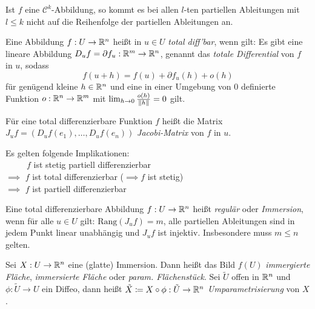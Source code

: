\documentclass{cheat-sheet}
\newcommand{\Cont}{\mathcal{C}} %
\begin{document}
\begin{satz}
  Ist $f$ eine $\Cont^k$-Abbildung, so kommt es bei allen $l$-ten partiellen Ableitungen mit $l \leq k$ nicht auf die Reihenfolge der partiellen Ableitungen an.
\end{satz}

\begin{defn}
  Eine Abbildung $f : U \to \mathbb{R}^n$ heißt in $u \in U$ \emph{total diff'bar}, wenn gilt: Es gibt eine lineare Abbildung $D_u f = \partial f_u : \mathbb{R}^m \to \mathbb{R}^n$, genannt das \emph{totale Differential} von $f$ in $u$, sodass
  \[
    f(u + h) = f(u) + \partial f_u(h) + o(h)
  \]
  für genügend kleine $h \in \mathbb{R}^n$ und eine in einer Umgebung von $0$ definierte Funktion $o : \mathbb{R}^n \to \mathbb{R}^m$ mit $\lim_{h \to 0} \tfrac{o(h)}{\lVert h\rVert} = 0$ gilt.
\end{defn}

\begin{defn}
  Für eine total differenzierbare Funktion $f$ heißt die Matrix $J_u f = (D_u f(e_1), \ldots, D_u f(e_n))$ \emph{Jacobi-Matrix} von $f$ in $u$.
\end{defn}

\begin{bem}
Es gelten folgende Implikationen:\\
$\quad\quad\,\,\, f$ ist stetig partiell differenzierbar\\
$\implies$ $f$ ist total differenzierbar ($\!\implies f$ ist stetig)\\
$\implies$ $f$ ist partiell differenzierbar
\end{bem}


\begin{defn}
  Eine total differenzierbare Abbildung $f : U \to \mathbb{R}^n$ heißt \emph{regulär} oder \emph{Immersion}, wenn für alle $u \in U$ gilt: $\mathrm{Rang}(J_u f) = m$, \dh{} alle partiellen Ableitungen sind in jedem Punkt linear unabhängig und $J_u f$ ist injektiv. Insbesondere muss $m \leq n$ gelten.
\end{defn}


\begin{defn}
  Sei $X : U \to \mathbb{R}^n$ eine (glatte) Immersion. Dann heißt das Bild $f(U)$ \emph{immergierte Fläche}, \emph{immersierte Fläche} oder \emph{param. Flächenstück}. Sei $\tilde{U}$ offen in $\mathbb{R}^n$ und $\phi : \tilde{U} \to U$ ein Diffeo, dann heißt $\tilde{X} \coloneqq X \circ \phi : \tilde{U} \to \mathbb{R}^n$ \emph{Umparametrisierung} von $X$.
\end{defn}
\end{document}
